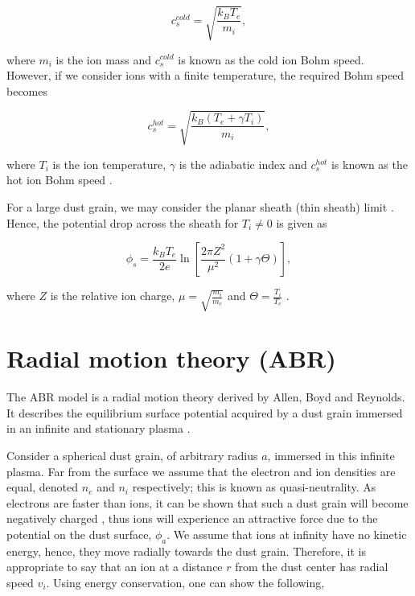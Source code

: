 \documentclass{article}
\begin{document}
\smallskip 

\begin{equation}\label{eq:ColdBohm}
c_{s}^{cold} = \sqrt{\frac{k_{B}T_{e}}{m_{i}}},
\end{equation}

\noindent where $m_i$ is the ion mass and $c_{s}^{cold}$ is known as the cold ion Bohm speed. 
However, if we consider ions with a finite temperature, the required Bohm speed becomes 

\begin{equation}\label{eq:HotBohm}
c_{s}^{hot} = \sqrt{\frac{k_{B}(T_{e} + \gamma T_{i})}{m_{i}}},
\end{equation}

\smallskip

\noindent where $T_i$ is the ion temperature, $\gamma$ is the adiabatic index
and $c_{s}^{hot}$ is known as the hot ion Bohm speed \cite{Stangeby1986} \cite{Willis} .

\medskip

For a large dust grain, we may consider the planar sheath (thin sheath) limit \cite{Willis}. 
Hence, the potential drop across the sheath for $T_i \neq 0$ is given as

\begin{equation}\label{eq:SheathDrop}
\phi_s = \frac{k_B T_e}{2e}\ln{\left[\frac{2\pi Z^2}{\mu^2}(1 + \gamma \Theta)\right]},
\end{equation}

\noindent where $Z$ is the relative ion charge, $\mu = \sqrt{\frac{m_i}{m_e}}$ and $\Theta = \frac{T_i}{T_e}$ \cite{Stangeby1986}.

\section{Radial motion theory (ABR)}

\smallskip

The ABR model is a radial motion theory derived by Allen, Boyd and Reynolds. It describes the equilibrium surface potential acquired
by a dust grain immersed in an infinite and stationary plasma \cite{ABR}.

\medskip

Consider a spherical dust grain, of arbitrary radius $a$, immersed in this infinite plasma. Far from the surface we assume that the electron
and ion densities are equal, denoted $n_e$ and $n_i$ respectively; this is known as quasi-neutrality. As electrons are faster than ions, it can be shown that such a dust grain will become negatively 
charged \cite{Thomas}, thus ions will experience an attractive force due to the potential on the dust surface, 
$\phi_a$. We assume that ions at infinity have no kinetic energy, hence, they move radially
towards the dust grain. Therefore, it is appropriate to say that an ion at a distance 
$r$ from the dust center has radial speed $v_i$. Using energy conservation, one can show the following,
\end{document}
